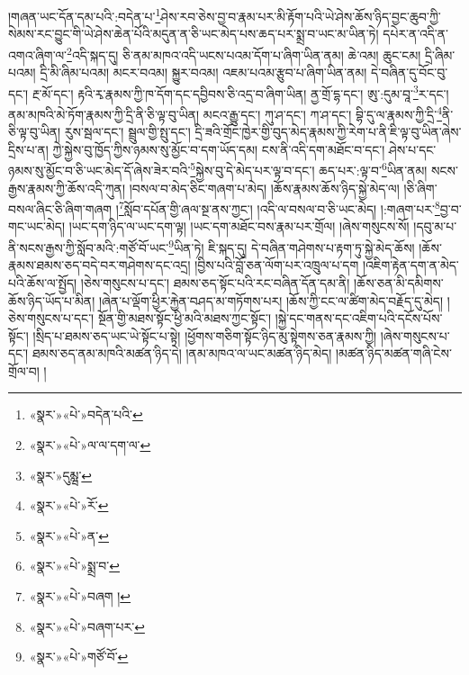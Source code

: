 །གཞན་ཡང་དོན་དམ་པའི་:བདེན་པ་\footnote{«སྣར་»«པེ་»བདེན་པའི་}ཤེས་རབ་ཅེས་བྱ་བ་རྣམ་པར་མི་རྟོག་པའི་ཡེ་ཤེས་ཆོས་ཉིད་བྱང་ཆུབ་ཀྱི་སེམས་རང་བྱུང་གི་ཡེ་ཤེས་ཆེན་པོའི་མདུན་ན་ཅི་ཡང་མེད་པས་ཆད་པར་སྨྲ་བ་ཡང་མ་ཡིན་ཏེ། དཔེར་ན་འདི་ན་འགའ་ཞིག་ལ་\footnote{«སྣར་»«པེ་»ལ་ལ་དག་ལ་}འདི་སྐད་དུ། ཅི་ནམ་མཁའ་འདི་ཡངས་པའམ་དོག་པ་ཞིག་ཡིན་ནམ། ཆེ་འམ། ཆུང་ངམ། དྲི་ཞིམ་པའམ། དྲི་མི་ཞིམ་པའམ། མངར་བའམ། སྐྱུར་བའམ། འཇམ་པའམ་རྩུབ་པ་ཞིག་ཡིན་ནམ། དེ་བཞིན་དུ་བོང་བུ་དང་། རྔ་མོ་དང་། རྟའི་རྭ་རྣམས་ཀྱི་ཁ་དོག་དང་དབྱིབས་ཅི་འདྲ་བ་ཞིག་ཡིན། ནྱ་གྲོ་དྷ་དང་། ཨུ་:དུམ་བཱ་\footnote{«སྣར་»དུམྺ་}ར་དང་། ནམ་མཁའི་མེ་ཏོག་རྣམས་ཀྱི་དྲི་ནི་ཅི་ལྟ་བུ་ཡིན། མངའ་རྒྱུ་དང་། ཀུ་ཤ་དང་། ཀ་ཤ་དང་། བྷི་དུ་ལ་རྣམས་ཀྱི་དྲི་\footnote{«སྣར་»«པེ་»རོ་}ནི་ཅི་ལྟ་བུ་ཡིན། རུས་སྦལ་དང་། སྦྲུལ་གྱི་སྤུ་དང་། དྲི་ཟའི་གྲོང་ཁྱེར་གྱི་བུད་མེད་རྣམས་ཀྱི་རེག་པ་ནི་ཇི་ལྟ་བུ་ཡིན་ཞེས་དྲིས་པ་ན། ཀྱེ་སྐྱེས་བུ་ཁྱོད་ཀྱིས་ཉམས་སུ་མྱོང་བ་དག་ཡོད་དམ། ངས་ནི་འདི་དག་མཐོང་བ་དང་། ཤེས་པ་དང་ཉམས་སུ་མྱོང་བ་ཅི་ཡང་མེད་དོ་ཞེས་ཟེར་བའི་\footnote{«སྣར་»«པེ་»ན་}སྐྱེས་བུ་དེ་མེད་པར་ལྟ་བ་དང་། ཆད་པར་:ལྟ་བ་\footnote{«སྣར་»«པེ་»སྨྲ་བ་}ཡིན་ནམ། སངས་རྒྱས་རྣམས་ཀྱི་ཆོས་འདི་ཀུན། །བསལ་བ་མེད་ཅིང་གཞག་པ་མེད། །ཆོས་རྣམས་ཆོས་ཉིད་སྐྱེ་མེད་ལ། །ཅི་ཞིག་བསལ་ཞིང་ཅི་ཞིག་གཞག །\footnote{«སྣར་»«པེ་»བཞག །}སློབ་དཔོན་གྱི་ཞལ་སྔ་ནས་ཀྱང་། །འདི་ལ་བསལ་བ་ཅི་ཡང་མེད། །:གཞག་པར་\footnote{«སྣར་»«པེ་»བཞག་པར་}བྱ་བ་གང་ཡང་མེད། །ཡང་དག་ཉིད་ལ་ཡང་དག་ལྟ། །ཡང་དག་མཐོང་བས་རྣམ་པར་གྲོལ། །ཞེས་གསུངས་སོ། །དབུ་མ་པ་ནི་སངས་རྒྱས་ཀྱི་སློབ་མའི་:གཙོ་བོ་ཡང་\footnote{«སྣར་»«པེ་»གཙོ་བོ་}ཡིན་ཏེ། ཇི་སྐད་དུ། དེ་བཞིན་གཤེགས་པ་རྟག་ཏུ་སྐྱེ་མེད་ཆོས། །ཆོས་རྣམས་ཐམས་ཅད་བདེ་བར་གཤེགས་དང་འདྲ། །བྱིས་པའི་བློ་ཅན་ལོག་པར་འཁྲུལ་པ་དག །འཇིག་རྟེན་དག་ན་མེད་པའི་ཆོས་ལ་སྤྱོད། །ཅེས་གསུངས་པ་དང་། ཐམས་ཅད་སྟོང་པའི་རང་བཞིན་དོན་དམ་ནི། །ཆོས་ཅན་མི་དམིགས་ཆོས་ཉིད་ཡོད་པ་མིན། །ཞེན་པ་ལྡོག་ཕྱིར་རྐྱེན་བཤད་མ་གཏོགས་པར། །ཆོས་ཀྱི་ངང་ལ་ཚིག་མེད་བརྗོད་དུ་མེད། །ཅེས་གསུངས་པ་དང་། སྔོན་གྱི་མཐས་སྟོང་ཕྱི་མའི་མཐས་ཀྱང་སྟོང་། །སྐྱེ་དང་གནས་དང་འཇིག་པའི་དངོས་པོས་སྟོང་། །སྲིད་པ་ཐམས་ཅད་ཡང་ཡེ་སྟོང་པ་སྟེ། །ཕྱོགས་གཅིག་སྟོང་ཉིད་མུ་སྟེགས་ཅན་རྣམས་ཀྱི། །ཞེས་གསུངས་པ་དང་། ཐམས་ཅད་ནམ་མཁའི་མཚན་ཉིད་དེ། །ནམ་མཁའ་ལ་ཡང་མཚན་ཉིད་མེད། །མཚན་ཉིད་མཚན་གཞི་ངེས་གྲོལ་བ། །
